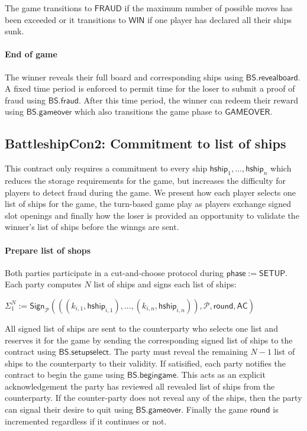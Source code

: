 \documentclass{llncs}
\newcommand{\gamestatus}{\mathsf{phase}}
\newcommand{\gamesetup}{\mathsf{SETUP}}
\newcommand{\gamewinner}{\mathsf{WIN}}
\newcommand{\gamefraud}{\mathsf{FRAUD}}
\newcommand{\gamefinished}{\mathsf{GAMEOVER}}
\newcommand{\hship}{\mathsf{hship}}
\newcommand{\participant}{\mathcal{P}}
\newcommand{\sign}{\mathsf{Sign}}
\newcommand{\battleshipfraud}{\mathsf{BS.fraud}}
\newcommand{\battleshipbegin}{\mathsf{BS.begingame}}
\newcommand{\battleshipselectboard}{\mathsf{BS.setupselect}}
\newcommand{\battleshiprevealboard}{\mathsf{BS.revealboard}}
\newcommand{\battleshipgameover}{\mathsf{BS.gameover}}
\newcommand{\appcontract}{\mathsf{AC}}
\begin{document}
The game transitions to $\gamefraud$ if the maximum number of possible moves has been exceeded or it transitions to $\gamewinner$ if one player has declared all their ships sunk. 

\paragraph{End of game} 

The winner reveals their full board and corresponding ships using $\battleshiprevealboard$.
A fixed time period is enforced to permit time for the loser to submit a proof of fraud using $\battleshipfraud$.
After this time period, the winner can redeem their reward using $\battleshipgameover$ which also transitions the game phase to $\gamefinished$. 

\subsection{BattleshipCon2: Commitment to list of ships } 

This contract only requires a commitment to every ship $\hship_{1},...,\hship_{n}$ which reduces the storage requirements for the game, but increases the difficulty for players to detect fraud during the game. 
We present how each player selects one list of ships for the game, the turn-based game play as players exchange signed slot openings and finally how the loser is provided an opportunity to validate the winner's list of ships before the winngs are sent. 

\paragraph{Prepare list of shops} Both parties participate in a cut-and-choose protocol during $\gamestatus := \gamesetup$. 
Each party computes $N$ list of ships and signs each list of ships:

\begin{center}
 $\Sigma_{1}^{N} := \sign_{\participant}(((k_{i,1},\hship_{i,1}),...,(k_{i,n},\hship_{i,n})), \participant, \mathsf{round}, \appcontract)$ 
\end{center}
 
All signed list of ships are sent to the counterparty who selects one list  and reserves it for the game by sending the corresponding signed list of ships to the contract using $\battleshipselectboard$. 
The party must reveal the remaining $N-1$ list of ships to the counterparty to their validity. 
If satisified, each party notifies the contract to begin the game using $\battleshipbegin$. 
This acts as an explicit acknowledgement the party has reviewed all revealed list of ships from the counterparty.
If the counter-party does not reveal any of the ships, then the party can signal their desire to quit  using $\battleshipgameover$.
Finally the game $\mathsf{round}$ is incremented regardless if it continues or not. 
\end{document}
